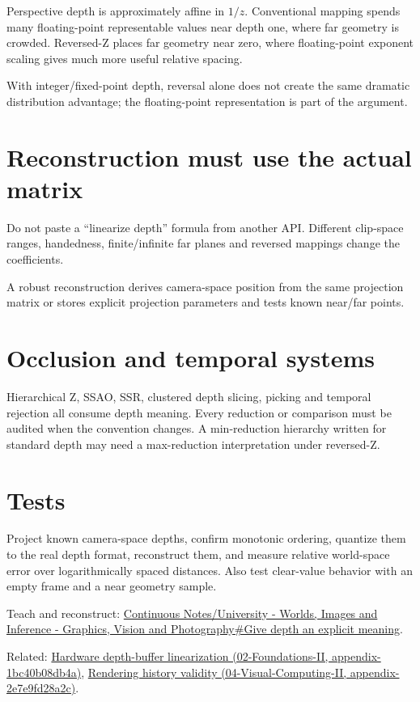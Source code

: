 Perspective depth is approximately affine in \(1/z\). Conventional mapping spends many floating-point representable values near depth one, where far geometry is crowded. Reversed-Z places far geometry near zero, where floating-point exponent scaling gives much more useful relative spacing.

With integer/fixed-point depth, reversal alone does not create the same dramatic distribution advantage; the floating-point representation is part of the argument.

\section{Reconstruction must use the actual matrix}\label{appendix-275ec8847057-reconstruction-must-use-the-actual-matrix}

Do not paste a ``linearize depth'' formula from another API. Different clip-space ranges, handedness, finite/infinite far planes and reversed mappings change the coefficients.

A robust reconstruction derives camera-space position from the same projection matrix or stores explicit projection parameters and tests known near/far points.

\section{Occlusion and temporal systems}\label{appendix-275ec8847057-occlusion-and-temporal-systems}

Hierarchical Z, SSAO, SSR, clustered depth slicing, picking and temporal rejection all consume depth meaning. Every reduction or comparison must be audited when the convention changes. A min-reduction hierarchy written for standard depth may need a max-reduction interpretation under reversed-Z.

\section{Tests}\label{appendix-275ec8847057-tests}

Project known camera-space depths, confirm monotonic ordering, quantize them to the real depth format, reconstruct them, and measure relative world-space error over logarithmically spaced distances. Also test clear-value behavior with an empty frame and a near geometry sample.

Teach and reconstruct: \href{Continuous\%20Notes/University\%20-\%20Worlds,\%20Images\%20and\%20Inference\%20-\%20Graphics,\%20Vision\%20and\%20Photography\#Give\%20depth\%20an\%20explicit\%20meaning}{Continuous Notes/University - Worlds, Images and Inference - Graphics, Vision and Photography\#Give depth an explicit meaning}.

Related: \href{../02-Foundations-II/main.pdf\#nameddest=appendix-1bc40b08db4a}{Hardware depth-buffer linearization (02-Foundations-II, appendix-1bc40b08db4a)}, \href{../04-Visual-Computing-II/main.pdf\#nameddest=appendix-2e7e9fd28a2c}{Rendering history validity (04-Visual-Computing-II, appendix-2e7e9fd28a2c)}.
